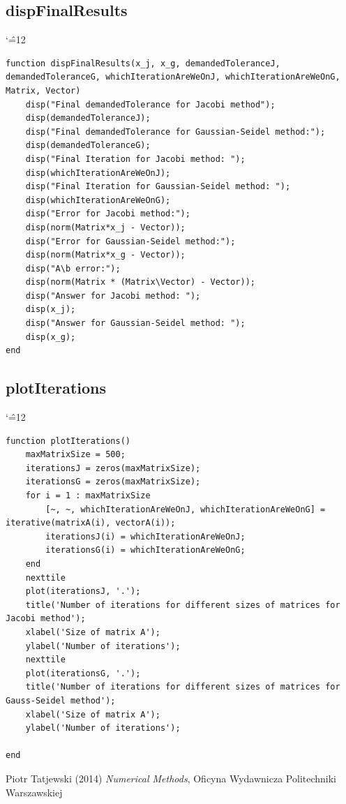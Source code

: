 \documentclass[12pt]{report}
\newenvironment{simplechar}{%
   \catcode`\^=12
}{}
\begin{document}
\subsection{dispFinalResults}
\begin{simplechar}
\begin{lstlisting}
function dispFinalResults(x_j, x_g, demandedToleranceJ, demandedToleranceG, whichIterationAreWeOnJ, whichIterationAreWeOnG, Matrix, Vector)
    disp("Final demandedTolerance for Jacobi method");
    disp(demandedToleranceJ);
    disp("Final demandedTolerance for Gaussian-Seidel method:");
    disp(demandedToleranceG);
    disp("Final Iteration for Jacobi method: ");
    disp(whichIterationAreWeOnJ);
    disp("Final Iteration for Gaussian-Seidel method: ");
    disp(whichIterationAreWeOnG);
    disp("Error for Jacobi method:");
    disp(norm(Matrix*x_j - Vector));
    disp("Error for Gaussian-Seidel method:");
    disp(norm(Matrix*x_g - Vector));
    disp("A\b error:");
    disp(norm(Matrix * (Matrix\Vector) - Vector));
    disp("Answer for Jacobi method: ");
    disp(x_j);
    disp("Answer for Gaussian-Seidel method: ");
    disp(x_g);
end
\end{lstlisting}
\end{simplechar}

\subsection{plotIterations}
\begin{simplechar}
\begin{lstlisting}
function plotIterations()
    maxMatrixSize = 500;
    iterationsJ = zeros(maxMatrixSize);
    iterationsG = zeros(maxMatrixSize);
    for i = 1 : maxMatrixSize
        [~, ~, whichIterationAreWeOnJ, whichIterationAreWeOnG] = iterative(matrixA(i), vectorA(i));
        iterationsJ(i) = whichIterationAreWeOnJ;
        iterationsG(i) = whichIterationAreWeOnG;
    end
    nexttile
    plot(iterationsJ, '.');
    title('Number of iterations for different sizes of matrices for Jacobi method');
    xlabel('Size of matrix A');
    ylabel('Number of iterations');
    nexttile
    plot(iterationsG, '.');
    title('Number of iterations for different sizes of matrices for Gauss-Seidel method');
    xlabel('Size of matrix A');
    ylabel('Number of iterations');

end
\end{lstlisting}
\end{simplechar}

\begin{thebibliography}{9}
Piotr Tatjewski (2014) \emph{Numerical Methods}, Oficyna Wydawnicza Politechniki Warszawskiej
\end{thebibliography}
\end{document}
